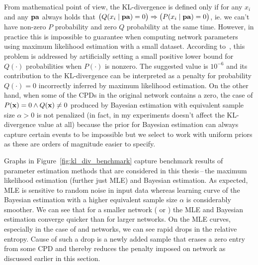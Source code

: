 \documentclass[english,cover]{fitthesis} %
\newcommand{\vars}[1]{{\bold{#1}}}         %
\begin{document}
From mathematical point of view, the KL-divergence is defined only if for any $x_i$ and any $\vars{pa}$ always holds that $\bigl( Q(x_i \mid \vars{pa}) = 0 \bigr) \Rightarrow \bigl( P(x_i \mid \vars{pa}) = 0 \bigr)$, ie. we can't have non-zero $P$ probability and zero $Q$ probability at the same time. However, in practice this is impossible to guarantee when computing network parameters using maximum likelihood estimation with a small dataset. According to~\cite{kl_divergence_wifi,kl_divergence_noisy_max}, this problem is addressed by artificially setting a small positive lower bound for $Q(\cdot)$ probabilities when $P(\cdot)$ is nonzero. The suggested value is $10^{-6}$ and its contribution to the KL-divergence can be interpreted as a penalty for probability $Q(\cdot) = 0$ incorrectly inferred by maximum likelihood estimation. On the other hand, when some of the CPDs in the original network contains a zero, the case of $P(\vars{x}) = 0 \land Q(\vars{x}) \neq 0$ produced by Bayesian estimation with equivalent sample size $\alpha > 0$ is not penalized (in fact, in my experiments doesn't affect the KL-divergence value at all) because the prior for Bayesian estimation can always capture certain events to be impossible but we select to work with uniform priors as these are orders of magnitude easier to specify.

Graphs in Figure~\ref{fig:kl_div_benchmark} capture benchmark results of parameter estimation methods that are considered in this thesis\,--\,the maximum likelihood estimation (further just MLE) and Bayesian estimation. As expected, MLE is sensitive to random noise in input data whereas learning curve of the Bayesian estimation with a higher equivalent sample size $\alpha$ is considerably smoother. We can see that for a smaller network ( or ) the MLE and Bayesian estimation converge quicker than for larger networks. On the MLE curves, especially in the case of  and  networks, we can see rapid drops in the relative entropy. Cause of such a drop is a newly added sample that erases a zero entry from some CPD and thereby reduces the penalty imposed on network as discussed earlier in this section.
\end{document}
